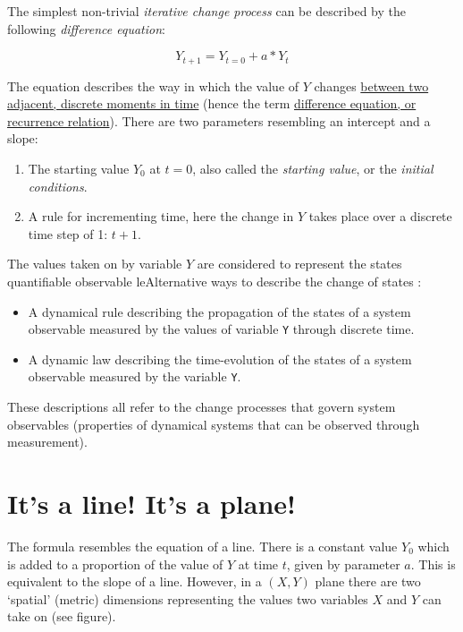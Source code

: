\documentclass[12pt,]{book}
\providecommand{\tightlist}{%
  \setlength{\itemsep}{0pt}\setlength{\parskip}{0pt}}
\let\stdsection\section
\renewcommand\section{\newpage\stdsection}
\theoremstyle{definition}
\theoremstyle{definition}
\theoremstyle{definition}
\theoremstyle{remark}
\begin{document}
The simplest non-trivial \emph{iterative change process} can be
described by the following \emph{difference equation}:

\[ Y_{t+1} = Y_{t=0} + a*Y_t \]

The equation describes the way in which the value of \(Y\) changes
\href{https://en.wikipedia.org/wiki/Discrete_time_and_continuous_time}{between
two adjacent, discrete moments in time} (hence the term
\href{https://en.wikipedia.org/wiki/Recurrence_relation}{difference
equation, or recurrence relation}). There are two parameters resembling
an intercept and a slope:

\begin{enumerate}
\def\labelenumi{\arabic{enumi}.}
\tightlist
\item
  The starting value \(Y_0\) at \(t=0\), also called the \emph{starting
  value}, or the \emph{initial conditions}.
\item
  A rule for incrementing time, here the change in \(Y\) takes place
  over a discrete time step of 1: \(t+1\).
\end{enumerate}

The values taken on by variable \(Y\) are considered to represent the
states quantifiable observable leAlternative ways to describe the change
of states :

\begin{itemize}
\tightlist
\item
  A dynamical rule describing the propagation of the states of a system
  observable measured by the values of variable \texttt{Y} through
  discrete time.
\item
  A dynamic law describing the time-evolution of the states of a system
  observable measured by the variable \texttt{Y}.
\end{itemize}

These descriptions all refer to the change processes that govern system
observables (properties of dynamical systems that can be observed
through measurement).

\section*{\texorpdfstring{\textbf{It's a line! It's a
plane!}}{It's a line! It's a plane!}}\label{its-a-line-its-a-plane}

The formula resembles the equation of a line. There is a constant value
\(Y_{0}\) which is added to a proportion of the value of \(Y\) at time
\(t\), given by parameter \(a\). This is equivalent to the slope of a
line. However, in a \((X,Y)\) plane there are two `spatial' (metric)
dimensions representing the values two variables \(X\) and \(Y\) can
take on (see figure).
\end{document}
